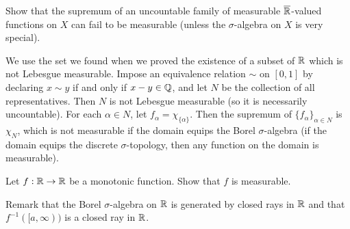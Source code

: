 \begin{prob}[Exercise 2.6]
    Show that the supremum of an uncountable family of measurable $\overline{{\mathbb{R}}}$-valued functions on $X$ can fail to be measurable (unless the $\sigma$-algebra on $X$ is very special).
\end{prob}
\begin{sol}
    We use the set we found when we proved the existence of a subset of ${\mathbb{R}}$ which is not Lebesgue measurable.
    Impose an equivalence relation $\sim$ on $[0, 1]$ by declaring $x\sim y$ if and only if $x-y\in{\mathbb{Q}}$, and let $N$ be the collection of all representatives.
    Then $N$ is not Lebesgue measurable (so it is necessarily uncountable).
    For each $\alpha\in N$, let $f_\alpha=\chi_{\{\alpha\}}$.
    Then the supremum of $\{f_\alpha\}_{\alpha\in N}$ is $\chi_N$, which is not measurable if the domain equips the Borel $\sigma$-algebra (if the domain equips the discrete $\sigma$-topology, then any function on the domain is measurable).
\end{sol}

\begin{prob}[Exercise 2.8]
    Let $f: {\mathbb{R}}\rightarrow{\mathbb{R}}$ be a monotonic function.
    Show that $f$ is measurable.
\end{prob}
\begin{sol}
    Remark that the Borel $\sigma$-algebra on ${\mathbb{R}}$ is generated by closed rays in ${\mathbb{R}}$ and that $f^{-1}([a, \infty))$ is a closed ray in ${\mathbb{R}}$.
\end{sol}